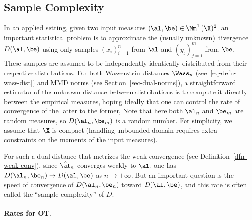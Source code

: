 \subsection{Sample Complexity}

In an applied setting, given two input measures $(\al,\be) \in \Mm_+^1(\X)^2$, an important statistical problem is to approximate the (usually unknown) divergence $D(\al,\be)$ using only samples $(x_i)_{i=1}^n$ from $\al$ and $(y_j)_{j=1}^m$ from $\be$. These samples are assumed to be independently identically distributed from their respective distributions.
%
For both Wasserstein distances $\Wass_p$ (see~\ref{eq-defn-wass-dist}) and MMD norms (see Section~\ref{sec-dual-norms}), a straightforward estimator of the unknown distance between distributions is to compute it directly between the empirical measures, hoping ideally that one can control the rate of convergence of the latter to the former,
Note that here both $\al_n$ and $\be_m$ are random measures, so $D(\al_n,\be_m)$ is a random number.
%
For simplicity, we assume that $\X$ is compact (handling unbounded domain requires extra constraints on the moments of the input measures).

For such a dual distance that metrizes the weak convergence (see Definition~\ref{dfn-weak-conv}), since $\hat\al_n$ converges weakly to $\al$, one has $D(\al_n,\be_n) \rightarrow D(\al,\be)$ as $n \rightarrow +\infty$.
%
But an important question is the speed of convergence of $D(\al_n,\be_n)$ toward $D(\al,\be)$, and this rate is often called the ``sample complexity'' of $D$.


\paragraph{Rates for OT.}

